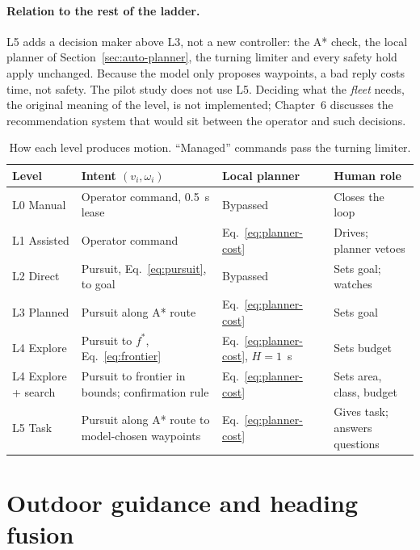 \paragraph{Relation to the rest of the ladder.}
L5 adds a decision maker above L3, not a new controller: the A* check, the local planner of Section~\ref{sec:auto-planner}, the turning limiter and every safety hold apply unchanged.
Because the model only proposes waypoints, a bad reply costs time, not safety.
The pilot study does not use L5.
Deciding what the \emph{fleet} needs, the original meaning of the level, is not implemented; Chapter~6 discusses the recommendation system that would sit between the operator and such decisions.

\begin{table}[ht]
\centering
\small
\caption{How each level produces motion. ``Managed'' commands pass the turning limiter.}
\label{tab:level-math}
\begin{tabularx}{\textwidth}{@{}l >{\raggedright\arraybackslash}X >{\raggedright\arraybackslash}p{2.2cm} >{\raggedright\arraybackslash}p{2.4cm}@{}}
\toprule
Level & Intent $(v_i, \omega_i)$ & Local planner & Human role \\
\midrule
L0 Manual & Operator command, 0.5~s lease & Bypassed & Closes the loop \\
L1 Assisted & Operator command & Eq.~\eqref{eq:planner-cost} & Drives; planner vetoes \\
L2 Direct & Pursuit, Eq.~\eqref{eq:pursuit}, to goal & Bypassed & Sets goal; watches \\
L3 Planned & Pursuit along A* route & Eq.~\eqref{eq:planner-cost} & Sets goal \\
L4 Explore & Pursuit to $f^\ast$, Eq.~\eqref{eq:frontier} & Eq.~\eqref{eq:planner-cost}, $H = 1$~s & Sets budget \\
L4 Explore + search & Pursuit to frontier in bounds; confirmation rule & Eq.~\eqref{eq:planner-cost} & Sets area, class, budget \\
L5 Task & Pursuit along A* route to model-chosen waypoints & Eq.~\eqref{eq:planner-cost} & Gives task; answers questions \\
\bottomrule
\end{tabularx}
\end{table}

\section{Outdoor guidance and heading fusion}
\label{sec:auto-outdoor}

